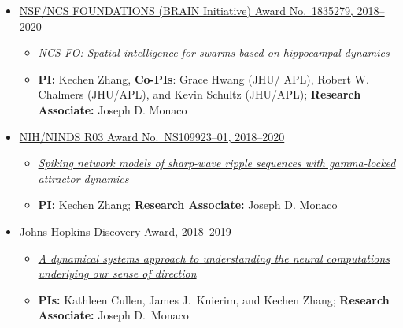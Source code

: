 \documentclass[10pt]{article}
\begin{document}
\begin{itemize}
\item
\href{https://www.nsf.gov/awardsearch/showAward?AWD_ID=1835279&HistoricalAwards=false}{
  NSF\slash NCS FOUNDATIONS (BRAIN Initiative) Award No.~1835279, 2018--2020}

\begin{itemize}

\item
\href{https://www.nsf.gov/awardsearch/showAward?AWD_ID=1835279&HistoricalAwards=false}{
  \emph{NCS-FO: Spatial intelligence for swarms based on hippocampal dynamics}}

\item \textbf{PI:} Kechen Zhang, \textbf{Co-PIs}: Grace Hwang (JHU\slash
APL), Robert W. Chalmers (JHU\slash APL), and Kevin Schultz (JHU\slash APL);
\textbf{Research Associate:} Joseph D. Monaco
\end{itemize}

\item \href{https://projectreporter.nih.gov/project_info_description.cfm?aid=9652210&icde=42555668&ddparam=&ddvalue=&ddsub=&cr=2&csb=default&cs=ASC&pball=}{
  NIH/NINDS R03 Award No.~NS109923--01, 2018--2020}

\begin{itemize}
\item \href{https://projectreporter.nih.gov/project_info_description.cfm?aid=9652210&icde=42555668&ddparam=&ddvalue=&ddsub=&cr=2&csb=default&cs=ASC&pball=}{
  \emph{Spiking network models of sharp-wave ripple sequences with gamma-locked attractor dynamics}}

\item \textbf{PI:} Kechen Zhang; \textbf{Research Associate:} Joseph D. Monaco

\end{itemize}

\item \href{https://research.jhu.edu/major-initiatives/discovery-awards/2018-awardees/}{
  Johns Hopkins Discovery Award, 2018--2019}

\begin{itemize}
\item \href{https://research.jhu.edu/major-initiatives/discovery-awards/2018-awardees/}{
  \emph{A dynamical systems approach to understanding the neural computations
underlying our sense of direction}}

\item \textbf{PIs:} Kathleen Cullen, James J.~Knierim, and Kechen Zhang;
\textbf{Research Associate:} Joseph D.~Monaco


\end{itemize}
\end{itemize}
\end{document}

